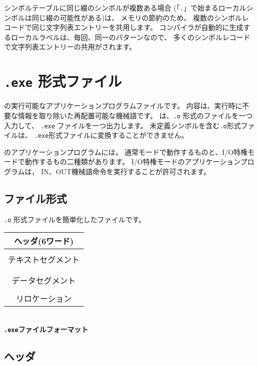 シンボルテーブルに同じ綴のシンボルが複数ある場合
(「\verb/./」で始まるローカルシンボルは同じ綴の可能性がある)は、
メモリの節約のため、
複数のシンボルレコードで同じ文字列表エントリーを共用します。
\cmm コンパイラが自動的に生成するローカルラベルは、毎回、同一のパターンなので、
多くのシンボルレコードで文字列表エントリーの共用がされます。

\section{{\tt .exe} 形式ファイル}
\label{app:eformat}

\tacos の実行可能なアプリケーションプログラムファイルです。
内容は、実行時に不要な情報を取り除いた再配置可能な機械語です。
{\objexe}は、{\tt .o} 形式のファイルを一つ入力して、
{\tt .exe} ファイルを一つ出力します。
未定義シンボルを含む{\tt .o}形式ファイルは、
{\tt .exe}形式ファイルに変換することができません。

\tacos のアプリケーションプログラムには，
通常モードで動作するものと、I/O特権モードで動作するもの二種類があります。
I/O特権モードのアプリケーションプログラムは，
IN、OUT機械語命令を実行することが許可されます。

\subsection{ファイル形式}

{\tt .o} 形式ファイルを簡単化したファイルです。

\begin{myminipage}
\begin{tabular}{|c|}
\hline
ヘッダ(6ワード) \\
\hline
\\
テキストセグメント \\
\\
\hline
\\
データセグメント \\
\\
\hline
リロケーション \\
\hline
\end{tabular}
\\\vspace{0.2cm}
{\bf {\tt .exe}ファイルフォーマット}
\end{myminipage}

\subsection{ヘッダ}

